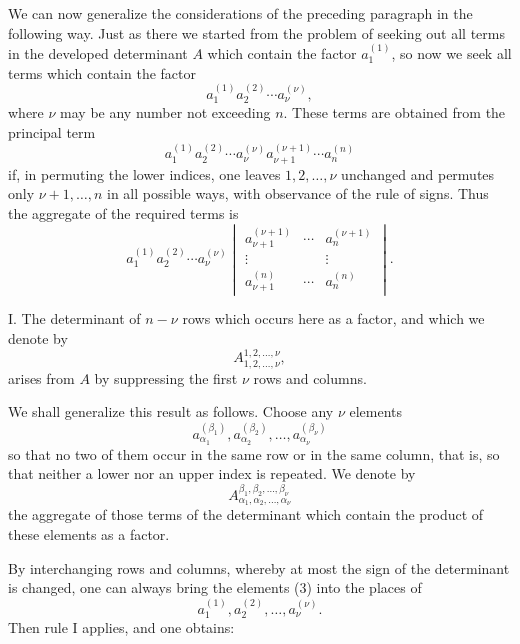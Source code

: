 \documentclass[11pt]{article}
\begin{document}
We can now generalize the considerations of the preceding paragraph in the following way.  Just as there we started from the problem of seeking out all terms in the developed determinant \(A\) which contain the factor \(a_1^{(1)}\), so now we seek all terms which contain the factor
\[
        a_1^{(1)}a_2^{(2)}\cdots a_\nu^{(\nu)},
\]
where \(\nu\) may be any number not exceeding \(n\).  These terms are obtained from the principal term
\[
        a_1^{(1)}a_2^{(2)}\cdots a_\nu^{(\nu)}a_{\nu+1}^{(\nu+1)}\cdots a_n^{(n)}
\]
if, in permuting the lower indices, one leaves \(1,2,\ldots,\nu\) unchanged and permutes only \(\nu+1,\ldots,n\) in all possible ways, with observance of the rule of signs.  Thus the aggregate of the required terms is
\begin{equation}
        a_1^{(1)}a_2^{(2)}\cdots a_\nu^{(\nu)}
        \begin{vmatrix}
        a_{\nu+1}^{(\nu+1)}&\cdots&a_n^{(\nu+1)}\\
        \vdots&&\vdots\\
        a_{\nu+1}^{(n)}&\cdots&a_n^{(n)}
        \end{vmatrix}.
\tag{1}
\end{equation}

I. The determinant of \(n-\nu\) rows which occurs here as a factor, and which we denote by
\[
        A_{1,2,\ldots,\nu}^{1,2,\ldots,\nu},
\]
arises from \(A\) by suppressing the first \(\nu\) rows and columns.

We shall generalize this result as follows.  Choose any \(\nu\) elements
\begin{equation}
        a_{\alpha_1}^{(\beta_1)},
        a_{\alpha_2}^{(\beta_2)},\ldots,
        a_{\alpha_\nu}^{(\beta_\nu)}
\tag{3}
\end{equation}
so that no two of them occur in the same row or in the same column, that is, so that neither a lower nor an upper index is repeated.  We denote by
\begin{equation}
        A_{\alpha_1,\alpha_2,\ldots,\alpha_\nu}^{\beta_1,\beta_2,\ldots,\beta_\nu}
\tag{2}
\end{equation}
the aggregate of those terms of the determinant which contain the product of these elements as a factor.

By interchanging rows and columns, whereby at most the sign of the determinant is changed, one can always bring the elements (3) into the places of
\[
        a_1^{(1)},a_2^{(2)},\ldots,a_\nu^{(\nu)}.
\]
Then rule I applies, and one obtains:
\end{document}
